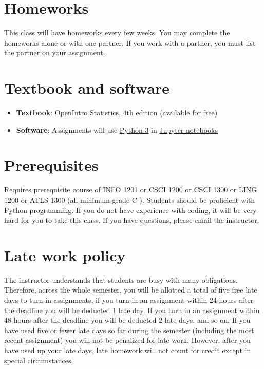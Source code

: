 \documentclass[10pt]{memoir}
\begin{document}
\section{\textbf{Homeworks}}
This class will have homeworks every few weeks. You may complete the homeworks alone or with one partner. If you work with a partner, you must list the partner on your assignment. 

\section{\textbf{Textbook and software }}

\begin{itemize}
\item \textbf{Textbook}: \href{https://www.abehandler.com/resources/openintro-statistics.pdf}{OpenIntro} Statistics, 4th edition (available for free)
\item \textbf{Software}: Assignments will use \href{https://www.python.org/}{Python 3} in \href{https://jupyter.org/}{Jupyter notebooks}
\end{itemize}

\section{\textbf{Prerequisites}}

Requires prerequisite course of INFO 1201 or CSCI 1200 or CSCI 1300 or LING 1200 or ATLS 1300 (all minimum grade C-). Students should be proficient with Python programming. If you do not have experience with coding, it will be very hard for you to take this class. If you have questions, please email the instructor.

\section{\textbf{Late work policy}}
The instructor understands that students are busy with many obligations. Therefore, across the whole semester, you will be allotted a total of five free late days to turn in assignments, if you turn in an assignment within 24 hours after the deadline you will be deducted 1 late day. If you turn in an assignment within 48 hours after the deadline you will be deducted 2 late days, and so on. If you have used five or fewer late days so far during the semester (including the most recent assignment) you will not be penalized for late work. However, after you have used up your late days, late homework will not count for credit except in special circumstances.
\end{document}

